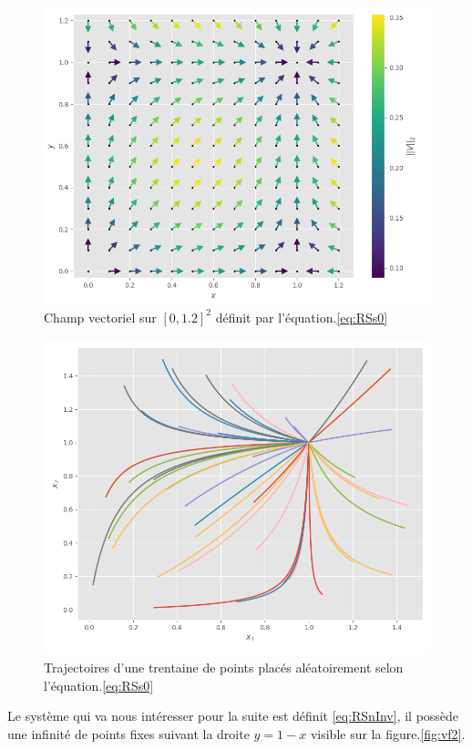 \documentclass{wsdcr}
\begin{document}
\begin{figure}
    \centering
    \includegraphics[width=\linewidth]{fig/lv2_vfs0.png}
    \caption{Champ vectoriel sur $[0,1.2]^2$ définit par l'équation.\ref{eq:RSs0}}
    \label{fig:vfs0}
\end{figure}
\begin{figure}
    \centering
    \includegraphics[width=\linewidth]{fig/lv2_ts0.png}
    \caption{Trajectoires d'une trentaine de points placés aléatoirement selon l'équation.\ref{eq:RSs0}}
    \label{fig:ts0}
\end{figure}
Le système qui va nous intéresser pour la suite est définit \ref{eq:RSnInv}, il possède une infinité de points fixes suivant la droite $y=1-x$ visible sur la figure.\ref{fig:vf2}.
\end{document}
